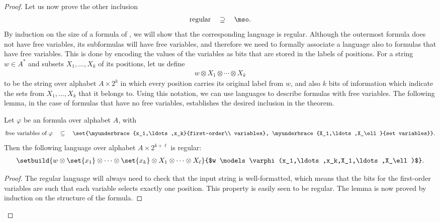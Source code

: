\begin{proof}
Let us now prove the other inclusion     \begin{align*}    \text{regular} \quad \supseteq \quad \text{\mso.}
    \end{align*}
    By induction on the size of a formula of \mso, we will show that the corresponding language is regular. Although the outermost formula does not have free variables, its subformulas will have free variables, and therefore we need to formally associate a language also to formulas that  have free variables. This is done by encoding the values of the variables as bits that are stored in the labels of positions. For a string $w \in A^*$ and subsets $X_1,\ldots,X_k$ of its positions, let us define 
    \begin{align*}
    w \otimes X_1 \otimes \cdots \otimes X_k 
    \end{align*}
    to be the string over alphabet $A \times 2^k$ in which every position carries its original label from $w$, and also $k$ bits of information which indicate the sets from $X_1,\ldots,X_k$ that it belongs to.  Using this notation, we can use languages to describe formulas with free variables. The following lemma, in the case of formulas that have no free variables, establishes the desired inclusion in the theorem. 
    \begin{lemma}\label{lem:mso-free-variables} Let $\varphi$ be an \mso formula over alphabet $A$, with
        \begin{align*}
            \text{free variables of $\varphi$} \quad \subseteq \quad 
        \set{\myunderbrace{x_1,\ldots,x_k}{first-order\\ variables}, 
        \myunderbrace{X_1,\ldots,X_\ell}{set  variables}}.
        \end{align*}
        Then the following language over alphabet $A \times 2^{k+\ell}$ is regular:
        \begin{align*}
        \setbuild{w \otimes \set{x_1} \otimes \cdots  \otimes \set{x_k} \otimes X_1 \otimes \cdots \otimes X_\ell}{$w \models \varphi(x_1,\ldots,x_k,X_1,\ldots,X_\ell)$}.   
        \end{align*}
    \end{lemma}
    \begin{proof}
        The regular language will always need to check that the input string is well-formatted, which means that the bits for the first-order variables are such that each variable selects exactly one position. This property is easily seen to be regular. The lemma is now proved by induction on the structure of the formula.

\end{proof}
\end{proof}
